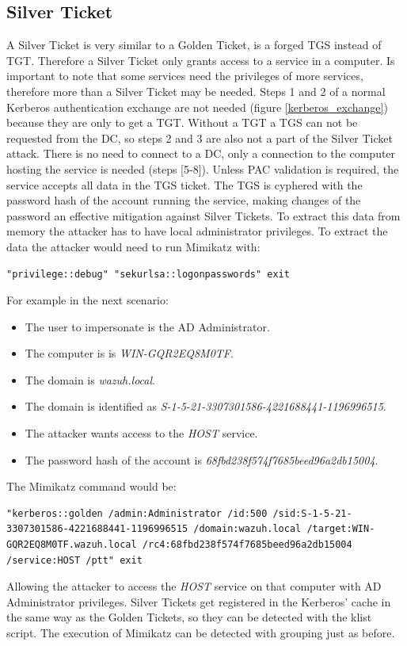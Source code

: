 \subsection{Silver Ticket}
A Silver Ticket is very similar to a Golden Ticket, is a forged TGS instead of TGT. Therefore a Silver Ticket only grants access to a service in a computer. Is important to note that some services need the privileges of more services, therefore more than a Silver Ticket may be needed.
\linej
Steps 1 and 2 of a normal Kerberos authentication exchange are not needed (figure \ref{kerberos_exchange}) because they are only to get a TGT. Without a TGT a TGS can not be requested from the DC, so steps 2 and 3 are also not a part of the Silver Ticket attack.
\linej
There is no need to connect to a DC, only a connection to the computer hosting the service is needed (steps [5-8]). Unless PAC validation is required, the service accepts all data in the TGS ticket.
\linej
The TGS is cyphered with the password hash of the account running the service, making changes of the password an effective mitigation against Silver Tickets.
To extract this data from memory the attacker has to have local administrator privileges\cite{events_1}\cite{silver_ticket}.
\linej
\linej
To extract the data the attacker would need to run Mimikatz with:
\begin{lstlisting}[style=PS,numbers=none]
"privilege::debug" "sekurlsa::logonpasswords" exit
\end{lstlisting}
\linej
For example in the next scenario:
\begin{itemize}
	\item The user to impersonate is the AD Administrator.
	\item The computer is is \textit{WIN-GQR2EQ8M0TF}.
	\item The domain is \textit{wazuh.local}.
	\item The domain is identified as \textit{S-1-5-21-3307301586-4221688441-1196996515}.
	\item The attacker wants access to the \textit{HOST} service.
	\item The password hash of the account is \textit{68fbd238f574f7685beed96a2db15004}.
\end{itemize}
The Mimikatz command would be:
\begin{lstlisting}[style=PS,numbers=none]
"kerberos::golden /admin:Administrator /id:500 /sid:S-1-5-21-3307301586-4221688441-1196996515 /domain:wazuh.local /target:WIN-GQR2EQ8M0TF.wazuh.local /rc4:68fbd238f574f7685beed96a2db15004 /service:HOST /ptt" exit
\end{lstlisting}
Allowing the attacker to access the \textit{HOST} service on that computer with AD Administrator privileges.
\linej
\linej
Silver Tickets get registered in the Kerberos' cache in the same way as the Golden Tickets, so they can be detected with the klist script. The execution of Mimikatz can be detected with grouping just as before.

